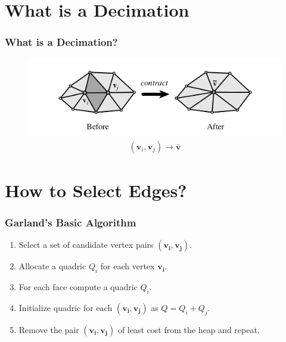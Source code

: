 \documentclass[
	10pt,
	t		%
]{beamer}
\begin{document}
\section{What is a Decimation}
\begin{frame}
\frametitle{What is a Decimation?}
\begin{figure}[ht]
\centering
\includegraphics[width=1\textwidth]{edge_contraction}
\begin{align}
(\mathbf{v}_i, \mathbf{v}_j)\rightarrow\bar{\mathbf{v}}
\end{align}
\end{figure}
\end{frame}

\section{How to Select Edges?}
\begin{frame}
\frametitle{Garland's Basic Algorithm}
\centering
\begin{enumerate}
\item Select a set of candidate vertex pairs $(\mathbf{v_i}, \mathbf{v_j})$.
\item Allocate a quadric $Q_i$ for each vertex $\mathbf{v_i}$.
\item For each face compute a quadric $Q_i$.
\item Initialize quadric for each $(\mathbf{v_i}, \mathbf{v_j})$ as $Q = Q_i + Q_j$.
\item Remove the pair $(\mathbf{v_i}, \mathbf{v_j})$ of least cost from the heap and repeat.
\end{enumerate}
\end{frame}
\end{document}
